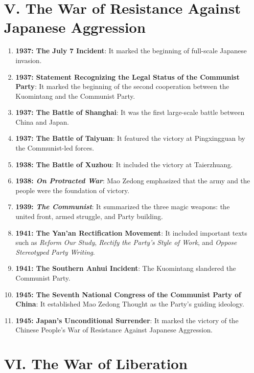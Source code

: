 \documentclass[12pt,a4paper]{ctexart}
\begin{document}
\section{V. The War of Resistance Against Japanese Aggression}

\begin{enumerate}[leftmargin=2em]
    \item \textbf{1937: The July 7 Incident}: It marked the beginning of full-scale Japanese invasion.
    \item \textbf{1937: Statement Recognizing the Legal Status of the Communist Party}: It marked the beginning of the second cooperation between the Kuomintang and the Communist Party.
    \item \textbf{1937: The Battle of Shanghai}: It was the first large-scale battle between China and Japan.
    \item \textbf{1937: The Battle of Taiyuan}: It featured the victory at Pingxingguan by the Communist-led forces.
    \item \textbf{1938: The Battle of Xuzhou}: It included the victory at Taierzhuang.
    \item \textbf{1938: \textit{On Protracted War}}: Mao Zedong emphasized that the army and the people were the foundation of victory.
    \item \textbf{1939: \textit{The Communist}}: It summarized the three magic weapons: the united front, armed struggle, and Party building.
    \item \textbf{1941: The Yan'an Rectification Movement}: It included important texts such as \textit{Reform Our Study}, \textit{Rectify the Party's Style of Work}, and \textit{Oppose Stereotyped Party Writing}.
    \item \textbf{1941: The Southern Anhui Incident}: The Kuomintang slandered the Communist Party.
    \item \textbf{1945: The Seventh National Congress of the Communist Party of China}: It established Mao Zedong Thought as the Party's guiding ideology.
    \item \textbf{1945: Japan's Unconditional Surrender}: It marked the victory of the Chinese People's War of Resistance Against Japanese Aggression.
\end{enumerate}

\section{VI. The War of Liberation}
\end{document}
